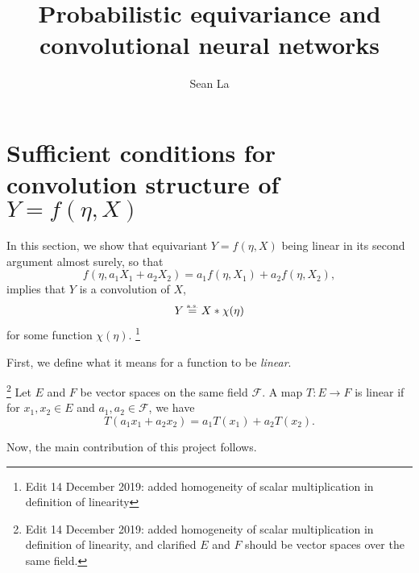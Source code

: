 \documentclass[10pt]{article}
\title{Probabilistic equivariance and convolutional neural networks} %
\author{Sean La} %
\begin{document}
\maketitle



\section{Sufficient conditions for convolution structure of $Y = f(\eta,X)$}
In this section, we show that equivariant $Y = f(\eta,X)$ being linear in its second argument almost surely, so that
$$
	f(\eta, a_1X_1 + a_2X_2) = a_1f(\eta,X_1) + a_2f(\eta,X_2),
$$
implies that $Y$ is a convolution of $X$,
$$
	Y \stackrel{\text{\rm\tiny a.s.}}{=} X * \chi(\eta)
$$
for some function $\chi(\eta)$. \footnote{Edit 14 December 2019: added homogeneity of scalar multiplication in definition of linearity}

First, we define what it means for a function to be \textit{linear}.
\begin{definition} \label{def:linear}\footnote{Edit 14 December 2019: added homogeneity of scalar multiplication in definition of linearity, and clarified $E$ and $F$ should be vector spaces over the same field.}
	Let $E$ and $F$ be vector spaces on the same field $\mathcal{F}$.	
	A map $T: E \to F$ is linear if for $x_1, x_2 \in E$ and $a_1, a_2 \in \mathcal{F}$, we have
	$$
		T(a_1x_1 + a_2x_2) = a_1T(x_1) + a_2T(x_2).
	$$ 
\end{definition}

\noindent

Now, the main contribution of this project follows.
\end{document}
